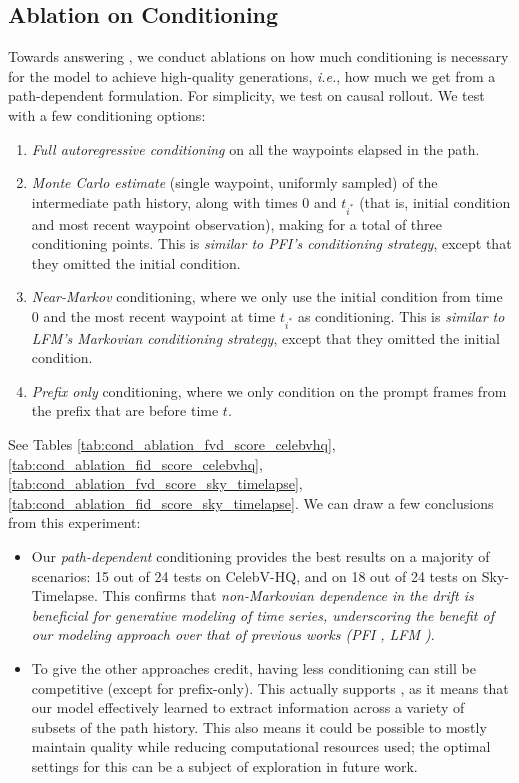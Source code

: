 \subsection{Ablation on Conditioning}\label{sec:cond_ablation}

Towards answering , we conduct ablations on how much conditioning is necessary for the model to achieve high-quality generations, \textit{i.e.}, how much we get from a path-dependent formulation. For simplicity, we test on causal rollout.
We test with a few conditioning options:
\begin{enumerate}
    \item \textit{Full autoregressive conditioning} on all the waypoints elapsed in the path.
    \item \textit{Monte Carlo estimate} (single waypoint, uniformly sampled) of the intermediate path history, along with times $0$ and $t_{i^*}$ (that is, initial condition and most recent waypoint observation), making for a total of three conditioning points. This is \textit{similar to PFI's \cite{chen2024probabilistic} conditioning strategy}, except that they omitted the initial condition.
    \item \textit{Near-Markov} conditioning, where we only use the initial condition from time $0$ and the most recent waypoint at time $t_{i^*}$ as conditioning. This is \textit{similar to LFM's \cite{islam2025longitudinal} Markovian conditioning strategy}, except that they omitted the initial condition.
    \item \textit{Prefix only} conditioning, where we only condition on the prompt frames from the prefix that are before time $t$.
\end{enumerate}

See Tables \ref{tab:cond_ablation_fvd_score_celebvhq}, \ref{tab:cond_ablation_fid_score_celebvhq}, \ref{tab:cond_ablation_fvd_score_sky_timelapse}, \ref{tab:cond_ablation_fid_score_sky_timelapse}.
We can draw a few conclusions from this experiment:
\begin{itemize}
    \item Our \textit{path-dependent} conditioning provides the best results on a majority of scenarios: 15 out of 24 tests on CelebV-HQ, and on 18 out of 24 tests on Sky-Timelapse. This confirms that \textit{non-Markovian dependence in the drift is beneficial for generative modeling of time series, underscoring the benefit of our modeling approach over that of previous works (PFI \cite{chen2024probabilistic}, LFM \cite{islam2025longitudinal})}.
    \item To give the other approaches credit, having less conditioning can still be competitive (except for prefix-only). This actually supports , as it means that our model effectively learned to extract information across a variety of subsets of the path history. This also means it could be possible to mostly maintain quality while reducing computational resources used; the optimal settings for this can be a subject of exploration in future work.
\end{itemize}




